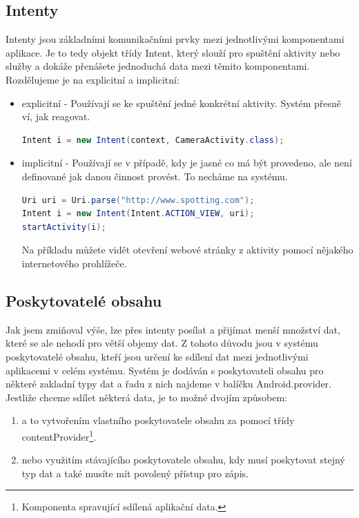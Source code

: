 \documentclass[12pt]{article}
\begin{document}
\subsection{Intenty}
Intenty jsou základními komunikačními prvky mezi jednotlivými komponentami aplikace. Je to tedy objekt třídy Intent, který slouží pro spuštění aktivity nebo služby a dokáže přenášete jednoduchá data mezi těmito komponentami. Rozdělujeme je na explicitní a implicitní:
\newpage
\begin{itemize}
\item explicitní - Používají se ke spuštění jedné konkrétní aktivity. Systém přesně ví, jak reagovat.

\begin{lstlisting}[language=Java,
title=Ukázka explicitního intentu.,
basicstyle=\ttfamily\small\color{black},
commentstyle=\itshape,
keywordstyle=\color{Blue},
showstringspaces=false,
frame=lines,
backgroundcolor=\color{lightGrey}
]
Intent i = new Intent(context, CameraActivity.class);
\end{lstlisting}
\item implicitní - Používají se v případě, kdy je jasné co má být provedeno, ale není definované jak danou činnost provést. To necháme na systému.
\begin{lstlisting}[language=Java,
title=Ukázka implicitního intentu.,
basicstyle=\ttfamily\small\color{black},
commentstyle=\itshape,
keywordstyle=\color{Blue},
showstringspaces=false,
frame=lines,
backgroundcolor=\color{lightGrey}
]
Uri uri = Uri.parse("http://www.spotting.com");
Intent i = new Intent(Intent.ACTION_VIEW, uri);
startActivity(i);
\end{lstlisting}
Na příkladu můžete vidět otevření webové stránky z aktivity pomocí nějakého internetového prohlížeče.
\end{itemize}
\subsection{Poskytovatelé obsahu}
Jak jsem zmiňoval výše, lze přes intenty posílat a přijímat menší množství dat, které se ale nehodí pro větší objemy dat. Z tohoto důvodu jsou v systému poskytovatelé obsahu, kteří jsou určení ke sdílení dat mezi jednotlivými aplikacemi v celém systému. Systém je dodáván s poskytovateli obsahu pro některé zakladní typy dat a řadu z nich najdeme v balíčku Android.provider. Jestliže chceme sdílet některá data, je to možné dvojím způsobem:
\begin{enumerate}
\item a to vytvořením vlastního poskytovatele obsahu za pomocí třídy contentProvider\footnote[8]{Komponenta spravující sdílená aplikační data.}.
\item nebo využitím stávajícího poskytovatele obsahu, kdy musí poskytovat stejný typ dat a také musíte mít povolený přístup pro zápis.
\end{enumerate}
\end{document}
